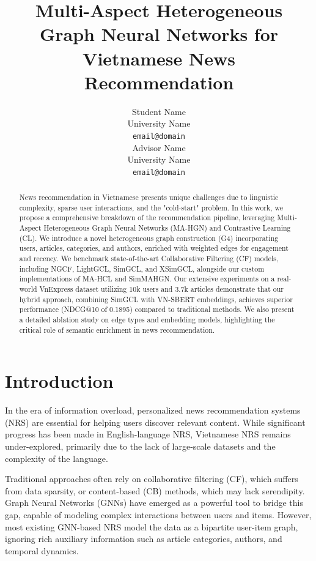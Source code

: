 \documentclass[11pt]{article}
\title{Multi-Aspect Heterogeneous Graph Neural Networks for \\ Vietnamese News Recommendation}
\author{Student Name \\
  University Name \\
  \texttt{email@domain} \\\And
  Advisor Name \\
  University Name \\
  \texttt{email@domain} \\}
\begin{document}
\maketitle

\begin{abstract}
    News recommendation in Vietnamese presents unique challenges due to linguistic complexity, sparse user interactions, and the "cold-start" problem. In this work, we propose a comprehensive breakdown of the recommendation pipeline, leveraging Multi-Aspect Heterogeneous Graph Neural Networks (MA-HGN) and Contrastive Learning (CL). We introduce a novel heterogeneous graph construction (G4) incorporating users, articles, categories, and authors, enriched with weighted edges for engagement and recency. We benchmark state-of-the-art Collaborative Filtering (CF) models, including NGCF, LightGCL, SimGCL, and XSimGCL, alongside our custom implementations of MA-HCL and SimMAHGN. Our extensive experiments on a real-world VnExpress dataset utilizing 10k users and 3.7k articles demonstrate that our hybrid approach, combining SimGCL with VN-SBERT embeddings, achieves superior performance (NDCG@10 of 0.1895) compared to traditional methods. We also present a detailed ablation study on edge types and embedding models, highlighting the critical role of semantic enrichment in news recommendation.
\end{abstract}

\section{Introduction}

In the era of information overload, personalized news recommendation systems (NRS) are essential for helping users discover relevant content. While significant progress has been made in English-language NRS, Vietnamese NRS remains under-explored, primarily due to the lack of large-scale datasets and the complexity of the language.

Traditional approaches often rely on collaborative filtering (CF), which suffers from data sparsity, or content-based (CB) methods, which may lack serendipity. Graph Neural Networks (GNNs) have emerged as a powerful tool to bridge this gap, capable of modeling complex interactions between users and items. However, most existing GNN-based NRS model the data as a bipartite user-item graph, ignoring rich auxiliary information such as article categories, authors, and temporal dynamics.
\end{document}
